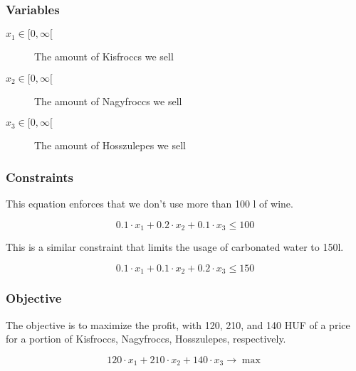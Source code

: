 \documentclass{article}
\begin{document}
	\subsubsection*{Variables}

	\begin{description}
		\item[$x_1\in[0,\infty[$] The amount of Kisfroccs we sell
		\item[$x_2\in[0,\infty[$] The amount of Nagyfroccs we sell
		\item[$x_3\in[0,\infty[$] The amount of Hosszulepes we sell
	\end{description}


	\subsubsection*{Constraints}

	 This equation enforces that we don't use more than 100 l of wine.

	$$ 0.1 \cdot x_1 + 0.2 \cdot x_2 + 0.1 \cdot x_3 \le 100 $$

	 This is a similar constraint that limits the usage of carbonated water to 150l.

	$$ 0.1 \cdot x_1 + 0.1 \cdot x_2 + 0.2 \cdot x_3 \le 150 $$

	\subsubsection*{Objective}

	 The objective is to maximize the profit, with 120, 210, and 140 HUF of a price for a portion of Kisfroccs, Nagyfroccs, Hosszulepes, respectively.

	$$ 120 \cdot x_1 + 210 \cdot x_2 + 140 \cdot x_3 \to  \max $$
\end{document}
